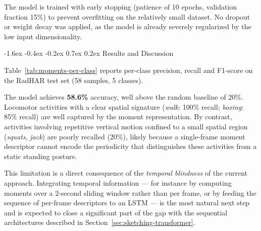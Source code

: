 \documentclass[10pt,twocolumn]{article}
\makeatletter
\renewcommand{\subsection}{%
  \@startsection{subsection}{2}{\z@}%
  {-1.6ex \@plus -0.4ex \@minus -0.2ex}%
  {0.7ex \@plus 0.2ex}%
  {\normalfont\normalsize\bfseries}}
\makeatother
\begin{document}
The model is trained with early stopping (patience of 10 epochs,
validation fraction 15\%) to prevent overfitting on the relatively small
dataset. No dropout or weight decay was applied, as the model is already
severely regularized by the low input dimensionality.

\subsection{Results and Discussion}
\label{sec:moments-discussion}

Table~\ref{tab:moments-per-class} reports per-class precision, recall and
F1-score on the RadHAR test set (58 samples, 5 classes).

\begin{table}[H]
\centering
\scriptsize
{}
\caption{Per-class performance of the moment-based MLP on RadHAR (test set).}
\label{tab:moments-per-class}
\end{table}

\noindent The model achieves \textbf{58.6\%} accuracy, well above the
random baseline of 20\%. Locomotor activities with a clear spatial signature
(\textit{walk}: 100\% recall; \textit{boxing}: 85\% recall) are well captured
by the moment representation. By contrast, activities involving repetitive
vertical motion confined to a small spatial region (\textit{squats},
\textit{jack}) are poorly recalled (20\%), likely because a single-frame
moment descriptor cannot encode the periodicity that distinguishes these
activities from a static standing posture.

This limitation is a direct consequence of the \emph{temporal blindness} of
the current approach. Integrating temporal information --- for instance by
computing moments over a 2-second sliding window rather than per frame, or by
feeding the sequence of per-frame descriptors to an LSTM --- is the most
natural next step and is expected to close a significant part of the gap with
the sequential architectures described in
Section~\ref{sec:sketching-transformer}.
\end{document}
